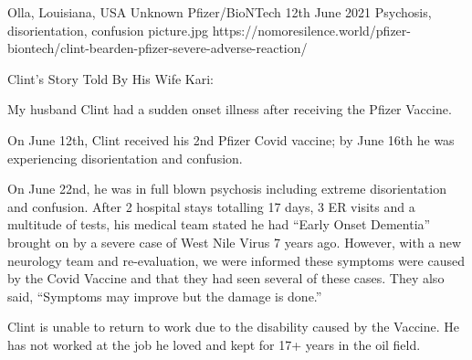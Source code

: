 {Olla, Louisiana, USA}
{Unknown}
{Pfizer/BioNTech}
{12th June 2021}
{Psychosis, disorientation, confusion}
{picture.jpg}
{https://nomoresilence.world/pfizer-biontech/clint-bearden-pfizer-severe-adverse-reaction/}
{

Clint’s Story Told By His Wife Kari:

My husband Clint had a sudden onset illness after receiving the Pfizer Vaccine.

On June 12th, Clint received his 2nd Pfizer Covid vaccine; by June 16th he was experiencing disorientation and confusion.

On June 22nd, he was in full blown psychosis including extreme disorientation and confusion. After 2 hospital stays totalling 17 days, 3 ER visits and a multitude of tests, his medical team stated he had “Early Onset Dementia” brought on by a severe case of West Nile Virus 7 years ago. However, with a new neurology team and re-evaluation, we were informed these symptoms were caused by the Covid Vaccine and that they had seen several of these cases. They also said, “Symptoms may improve but the damage is done.”

Clint is unable to return to work due to the disability caused by the Vaccine. He has not worked at the job he loved and kept for 17+ years in the oil field.
}
